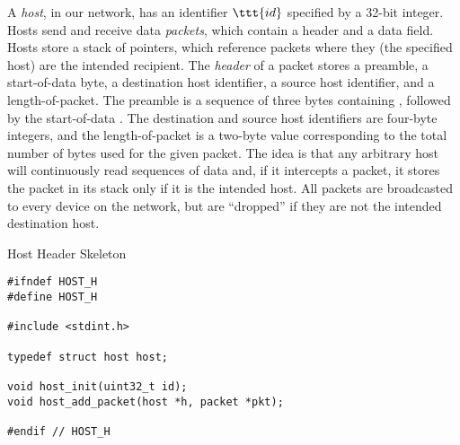 
A \textit{host}, in our network, has an identifier $\ttt{id}$ specified by a 32-bit integer. Hosts send and receive data \textit{packets}, which contain a header and a data field. Hosts store a stack of  pointers, which reference packets where they (the specified host) are the intended recipient. The \textit{header} of a packet stores a preamble, a start-of-data byte, a destination host identifier, a source host identifier, and a length-of-packet. The preamble is a sequence of three bytes containing   , followed by the start-of-data . The destination and source host identifiers are four-byte integers, and the length-of-packet is a two-byte value corresponding to the total number of bytes used for the given packet. The idea is that any arbitrary host will continuously read sequences of data and, if it intercepts a packet, it stores the packet in its stack only if it is the intended host. All packets are broadcasted to every device on the network, but are ``dropped'' if they are not the intended destination host.


\begin{cl}[host.h]{Host Header Skeleton}
\begin{lstlisting}[language=MyC]
#ifndef HOST_H
#define HOST_H

#include <stdint.h>

typedef struct host host;

void host_init(uint32_t id);
void host_add_packet(host *h, packet *pkt);

#endif // HOST_H
\end{lstlisting}
\end{cl}

